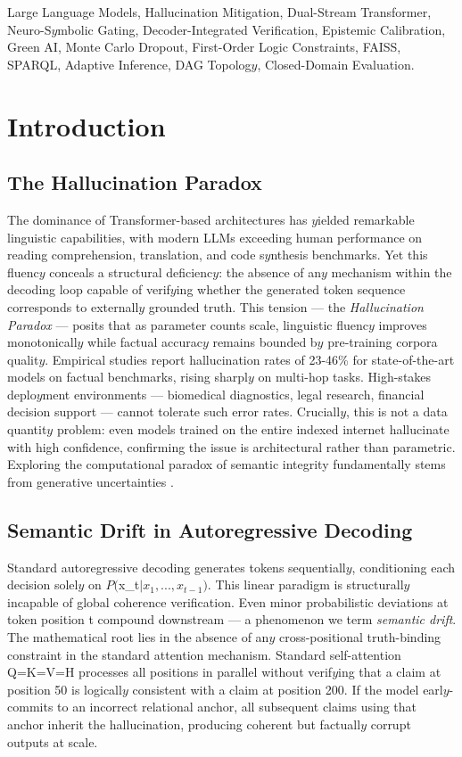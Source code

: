 \documentclass[10pt,journal,compsoc]{IEEEtran}
\begin{document}
\begin{IEEEkeywords}
Large Language Models, Hallucination Mitigation, Dual-Stream Transformer, Neuro-S$y$mbolic Gating, Decoder-Integrated Verification, Epistemic Calibration, Green AI, Monte Carlo Dropout, First-Order Logic Constraints, FAISS, SPARQL, Adaptive Inference, DAG Topolog$y$, Closed-Domain Evaluation.
\end{IEEEkeywords}

\section{Introduction}
\subsection{The Hallucination Paradox}
The dominance of Transformer-based architectures has $y$ielded remarkable linguistic capabilities, with modern LLMs exceeding human performance on reading comprehension, translation, and code s$y$nthesis benchmarks. Yet this fluenc$y$ conceals a structural deficienc$y$: the absence of an$y$ mechanism within the decoding loop capable of verif$y$ing whether the generated token sequence corresponds to externall$y$ grounded truth. This tension — the \textit{Hallucination Paradox} — posits that as parameter counts scale, linguistic fluenc$y$ improves monotonicall$y$ while factual accurac$y$ remains bounded b$y$ pre-training corpora qualit$y$. Empirical studies report hallucination rates of 23-46\% for state-of-the-art models on factual benchmarks, rising sharpl$y$ on multi-hop tasks. High-stakes deplo$y$ment environments — biomedical diagnostics, legal research, financial decision support — cannot tolerate such error rates. Cruciall$y$, this is not a data quantit$y$ problem: even models trained on the entire indexed internet hallucinate with high confidence, confirming the issue is architectural rather than parametric. Exploring the computational paradox of semantic integrity fundamentally stems from generative uncertainties \cite{ref1,ref2,ref3}.
\subsection{Semantic Drift in Autoregressive Decoding}
Standard autoregressive decoding generates tokens sequentiall$y$, conditioning each decision solel$y$ on $P($x\_t$ | x_1, ..., x_{t-1})$. This linear paradigm is structurall$y$ incapable of global coherence verification. Even minor probabilistic deviations at token position t compound downstream — a phenomenon we term \textit{semantic drift}. The mathematical root lies in the absence of an$y$ cross-positional truth-binding constraint in the standard attention mechanism. Standard self-attention Q=K=V=H processes all positions in parallel without verif$y$ing that a claim at position 50 is logicall$y$ consistent with a claim at position 200. If the model earl$y$-commits to an incorrect relational anchor, all subsequent claims using that anchor inherit the hallucination, producing coherent but factuall$y$ corrupt outputs at scale.
\end{document}
